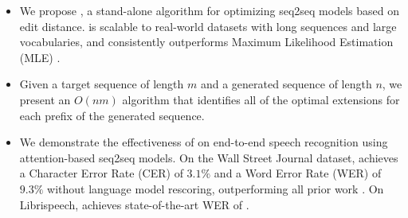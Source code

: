 \begin{itemize}[noitemsep,parsep=0pt,leftmargin=7mm]
    \item
    We propose \acronym, a stand-alone algorithm for optimizing seq2seq models based on
    edit distance. \acronym is scalable to real-world datasets with long sequences and large vocabularies, and consistently
    outperforms Maximum Likelihood Estimation (MLE) . 
    \item Given a target sequence of length $m$ and a generated sequence of length $n$, we present an $O(nm)$ algorithm
    that identifies all of the optimal extensions for each prefix of the generated sequence.
    \item We demonstrate the effectiveness of \acronym on end-to-end speech
    recognition using attention-based seq2seq models. On the Wall Street Journal
    dataset, \acronym achieves a Character Error Rate (CER) of $3.1\%$ and a Word Error Rate (WER) of
    $9.3\%$ without language model rescoring, outperforming all prior work . %
    On Librispeech, \acronym achieves state-of-the-art WER of .
\end{itemize}

